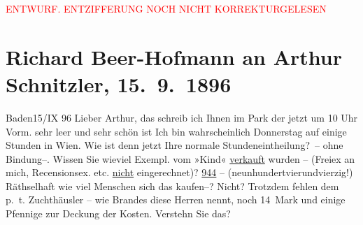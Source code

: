 
\begin{center}
            \textcolor{red}{ENTWURF. ENTZIFFERUNG NOCH NICHT KORREKTURGELESEN}
                      \end{center}
            
               \section[Richard Beer-Hofmann an Arthur Schnitzler, 15. 9. 1896]{ Richard Beer-Hofmann an Arthur Schnitzler,
               15. 9. 1896}\nopagebreak{}\rehead{ }\begin{ledgroupsized}[t]{13cm}\normalsize\beginnumbering{} \toendnotes[C]{\smallbreak\pagebreak[2]} 
\pstart
           {\pb}Baden15/IX 96\pend
           \pstart
           Lieber Arthur, das schreib ich Ihnen im Park der jetzt um 10
                  Uhr Vorm.
                sehr leer und sehr schön ist\pend
           \pstart
           Ich bin wahrscheinlich Donnerstag auf einige Stunden in Wien. Wie ist denn jetzt Ihre normale Stundeneintheilung? – ohne
                  {\pb}Bindung–. Wissen Sie wieviel
               Exempl. vom »Kind« \uline{verkauft} wurden – (Freiex an mich, Recensionsex. etc. \uline{nicht} eingerechnet)?\pend
           \pstart
           \uline{944} – (neunhundertvierundvierzig!) Räthselhaft wie
               viel Menschen sich das kaufen–? Nicht? Trotzdem {\pb}fehlen dem p. t. Zuchthäusler
               – wie Brandes diese Herren nennt, noch 14 Mark
               und einige Pfennige zur Deckung der Kosten. Verstehn Sie das?\pend

\end{ledgroupsized}
